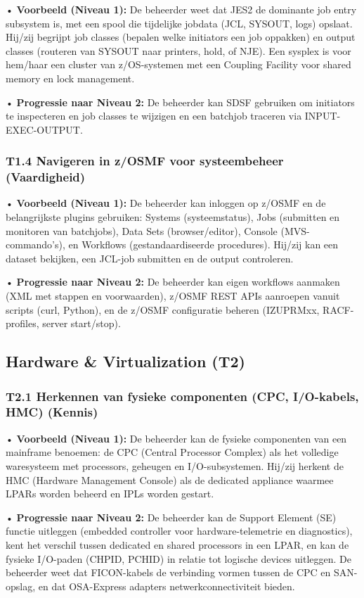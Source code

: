 • \textbf{Voorbeeld (Niveau 1):} De beheerder weet dat JES2 de dominante job entry subsystem is, met een spool die tijdelijke jobdata (JCL, SYSOUT, logs) opslaat. Hij/zij begrijpt job classes (bepalen welke initiators een job oppakken) en output classes (routeren van SYSOUT naar printers, hold, of NJE). Een sysplex is voor hem/haar een cluster van z/OS-systemen met een Coupling Facility voor shared memory en lock management.

• \textbf{Progressie naar Niveau 2:} De beheerder kan SDSF gebruiken om initiators te inspecteren en job classes te wijzigen en een batchjob traceren via INPUT-EXEC-OUTPUT.

\subsubsection{T1.4 Navigeren in z/OSMF voor systeembeheer (Vaardigheid)}

• \textbf{Voorbeeld (Niveau 1):} De beheerder kan inloggen op z/OSMF en de belangrijkste plugins gebruiken: Systems (systeemstatus), Jobs (submitten en monitoren van batchjobs), Data Sets (browser/editor), Console (MVS-commando's), en Workflows (gestandaardiseerde procedures). Hij/zij kan een dataset bekijken, een JCL-job submitten en de output controleren.

• \textbf{Progressie naar Niveau 2:} De beheerder kan eigen workflows aanmaken (XML met stappen en voorwaarden), z/OSMF REST APIs aanroepen vanuit scripts (curl, Python), en de z/OSMF configuratie beheren (IZUPRMxx, RACF-profiles, server start/stop).

\subsection{Hardware \& Virtualization (T2)}

\subsubsection{T2.1 Herkennen van fysieke componenten (CPC, I/O-kabels, HMC) (Kennis)}

• \textbf{Voorbeeld (Niveau 1):} De beheerder kan de fysieke componenten van een mainframe benoemen: de CPC (Central Processor Complex) als het volledige waresysteem met processors, geheugen en I/O-subsystemen. Hij/zij herkent de HMC (Hardware Management Console) als de dedicated appliance waarmee LPARs worden beheerd en IPLs worden gestart. 

• \textbf{Progressie naar Niveau 2:} De beheerder kan de Support Element (SE) functie uitleggen (embedded controller voor hardware-telemetrie en diagnostics), kent het verschil tussen dedicated en shared processors in een LPAR, en kan de fysieke I/O-paden (CHPID, PCHID) in relatie tot logische devices uitleggen. De beheerder weet dat FICON-kabels de verbinding vormen tussen de CPC en SAN-opslag, en dat OSA-Express adapters netwerkconnectiviteit bieden.

